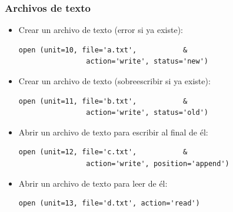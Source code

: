 \documentclass[12pt]{beamer}
\begin{document}
  \begin{frame}[fragile]
    \frametitle{Archivos de texto}
    \begin{itemize}
      \item Crear un archivo de texto (error si ya existe):
        \begin{lstlisting}[gobble=8,frame=single]
          open (unit=10, file='a.txt',           &
                action='write', status='new')
        \end{lstlisting}
      \item Crear un archivo de texto (sobreescribir si ya existe):
        \begin{lstlisting}[gobble=8,frame=single]
          open (unit=11, file='b.txt',           &
                action='write', status='old')
        \end{lstlisting}
      \item Abrir un archivo de texto para escribir al final de él:
        \begin{lstlisting}[gobble=8,frame=single]
          open (unit=12, file='c.txt',           &
                action='write', position='append')
        \end{lstlisting}
      \item Abrir un archivo de texto para leer de él:
        \begin{lstlisting}[gobble=8,frame=single]
          open (unit=13, file='d.txt', action='read')
        \end{lstlisting}
    \end{itemize}
    
\end{frame}
\end{document}

